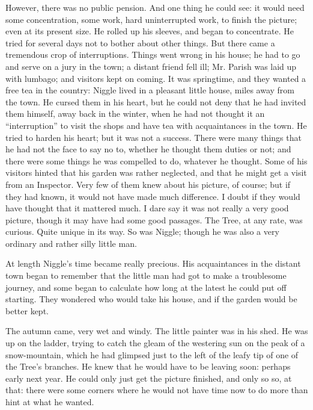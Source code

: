 \documentclass[english]{scrartcl}
\begin{document}
However, there was no public pension. And one thing he could see: it would need some concentration, some work, hard uninterrupted work, to finish the picture; even at its present size. He rolled up his sleeves, and began to concentrate. He tried for several days not to bother about other things. But there came a tremendous crop of interruptions. Things went wrong in his house; he had to go and serve on a jury in the town; a distant friend fell ill; Mr. Parish was laid up with lumbago; and visitors kept on coming. It was springtime, and they wanted a free tea in the country: Niggle lived in a pleasant little house, miles away from the town. He cursed them in his heart, but he could not deny that he had invited them himself, away back in the winter, when he had not thought it an “interruption” to visit the shops and have tea with acquaintances in the town. He tried to harden his heart; but it was not a success. There were many things that he had not the face to say no to, whether he thought them duties or not; and there were some things he was compelled to do, whatever he thought. Some of his visitors hinted that his garden was rather neglected, and that he might get a visit from an Inspector. Very few of them knew about his picture, of course; but if they had known, it would not have made much difference. I doubt if they would have thought that it mattered much. I dare say it was not really a very good picture, though it may have had some good passages. The Tree, at any rate, was curious. Quite unique in its way. So was Niggle; though he was also a very ordinary and rather silly little man.

At length Niggle’s time became really precious. His acquaintances in the distant town began to remember that the little man had got to make a troublesome journey, and some began to calculate how long at the latest he could put off starting. They wondered who would take his house, and if the garden would be better kept.

The autumn came, very wet and windy. The little painter was in his shed. He was up on the ladder, trying to catch the gleam of the westering sun on the peak of a snow-mountain, which he had glimpsed just to the left of the leafy tip of one of the Tree’s branches. He knew that he would have to be leaving soon: perhaps early next year. He could only just get the picture finished, and only so so, at that: there were some corners where he would not have time now to do more than hint at what he wanted.
\end{document}

